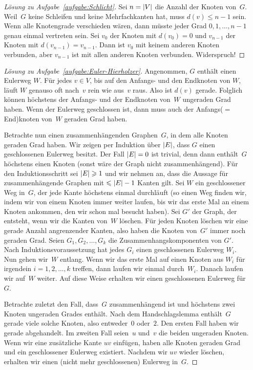\begin{proof}[Lösung zu Aufgabe~\ref{aufgabe:Schlicht}]
	Sei $n=\abs*{V}$ die Anzahl der Knoten von~$G$. Weil~$G$ keine Schleifen und keine Mehrfachkanten hat, muss $d(v)\leqslant n-1$ sein. Wenn alle Knotengrade verschieden wären, dann müsste jeder Grad $0,1,\dotsc,n-1$ genau einmal vertreten sein. Sei $v_0$ der Knoten mit $d(v_0)=0$ und $v_{n-1}$ der Knoten mit $d(v_{n-1})=v_{n-1}$. Dann ist $v_0$ mit keinem anderen Knoten verbunden, aber $v_{n-1}$ ist mit allen anderen Knoten verbunden. Widerspruch!
\end{proof}
\begin{proof}[Lösung zu Aufgabe~\ref{aufgabe:Euler-Hierholzer}]
	Angenommen, $G$ enthält einen Eulerweg $W$. Für jedes $v\in V$, bis auf den Anfangs- und den Endknoten von $W$, läuft $W$ genauso oft nach~$v$ rein wie aus~$v$ raus. Also ist $d(v)$ gerade. Folglich können höchstens der Anfangs- und der Endknoten von~$W$ ungeraden Grad haben. Wenn der Eulerweg geschlossen ist, dann muss auch der Anfangs($=$End)knoten von~$W$ geraden Grad haben.
	
	Betrachte nun einen zusammenhängenden Graphen~$G$, in dem alle Knoten geraden Grad haben. Wir zeigen per Induktion über $\abs*{E}$, dass $G$ einen geschlossenen Eulerweg besitzt. Der Fall $\abs*{E}=0$ ist trivial, denn dann enthält~$G$ höchstens einen Knoten (sonst wäre der Graph nicht zusammenhängend). Für den Induktionsschritt sei $\abs*{E}\geqslant 1$ und wir nehmen an, dass die Aussage für zusammenhängende Graphen mit $\leqslant\abs*{E}-1$ Kanten gilt. Sei $W$ ein geschlossener Weg in~$G$, der jede Kante höchstens einmal durchläuft (so einen Weg finden wir, indem wir von einem Knoten immer weiter laufen, bis wir das erste Mal an einem Knoten ankommen, den wir schon mal besucht haben). Sei $G'$ der Graph, der entsteht, wenn wir die Kanten von~$W$ löschen. Für jeden Knoten löschen wir eine gerade Anzahl angrenzender Kanten, also haben die Knoten von~$G'$ immer noch geraden Grad. Seien $G_1,G_2,\dotsc,G_k$ die Zusammenhangskomponenten von $G'$. Nach Induktionsvoraussetzung hat jedes $G_i$ einen geschlossenen Eulerweg $W_i$. Nun gehen wir~$W$ entlang. Wenn wir das erste Mal auf einen Knoten aus $W_i$ für irgendein $i=1,2,\dotsc,k$ treffen, dann laufen wir einmal durch~$W_i$. Danach laufen wir auf~$W$ weiter. Auf diese Weise erhalten wir einen geschlossenen Eulerweg für~$G$.
	
	Betrachte zuletzt den Fall, dass~$G$ zusammenhängend ist und höchstens zwei Knoten ungeraden Grades enthält. Nach dem Handschlagslemma enthält~$G$ gerade viele solche Knoten, also entweder~$0$ oder~$2$. Den ersten Fall haben wir gerade abgehandelt. Im zweiten Fall seien~$u$ und~$v$ die beiden ungeraden Knoten. Wenn wir eine zusätzliche Kante $uv$ einfügen, haben alle Knoten geraden Grad und ein geschlossener Eulerweg existiert. Nachdem wir $uv$ wieder löschen, erhalten wir einen (nicht mehr geschlossenen) Eulerweg in~$G$.
\end{proof}
